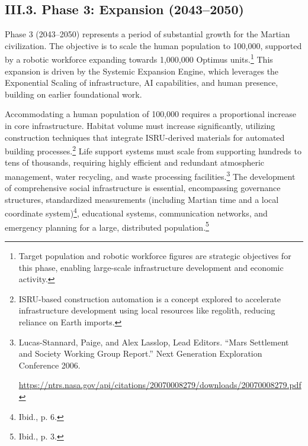 \documentclass[fontsize=10pt, oneside, DIV=calc]{scrartcl}
\begin{document}
\subsection*{III.3. Phase 3: Expansion (2043–2050)}



\noindent Phase 3 (2043--2050) represents a period of substantial growth for the Martian civilization. The objective is to scale the human population to 100,000, supported by a robotic workforce expanding towards 1,000,000 Optimus units.\footnote{Target population and robotic workforce figures are strategic objectives for this phase, enabling large-scale infrastructure development and economic activity.} This expansion is driven by the Systemic Expansion Engine, which leverages the Exponential Scaling of infrastructure, AI capabilities, and human presence, building on earlier foundational work.

\medskip

\noindent Accommodating a human population of 100,000 requires a proportional increase in core infrastructure. Habitat volume must increase significantly, utilizing construction techniques that integrate ISRU-derived materials for automated building processes.\footnote{ISRU-based construction automation is a concept explored to accelerate infrastructure development using local resources like regolith, reducing reliance on Earth imports.} Life support systems must scale from supporting hundreds to tens of thousands, requiring highly efficient and redundant atmospheric management, water recycling, and waste processing facilities.\footnote{Lucas-Stannard, Paige, and Alex Lasslop, Lead Editors. ``Mars Settlement and Society Working Group Report.'' Next Generation Exploration Conference 2006. 







\href{https://ntrs.nasa.gov/api/citations/20070008279/downloads/20070008279.pdf}\url{https://ntrs.nasa.gov/api/citations/20070008279/downloads/20070008279.pdf}} The development of comprehensive social infrastructure is essential, encompassing governance structures, standardized measurements (including Martian time and a local coordinate system)\footnote{Ibid., p. 6.}, educational systems, communication networks, and emergency planning for a large, distributed population.\footnote{Ibid., p. 3.}

\medskip
\end{document}
